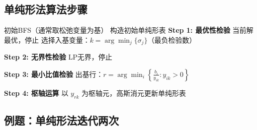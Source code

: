 \subsection{单纯形法算法步骤}

\begin{algorithm}[H]
\caption{单纯形法}
\begin{algorithmic}[1]
\Require 初始BFS（通常取松弛变量为基）
\State 构造初始单纯形表
    \State \textbf{Step 1: 最优性检验}
        \State 当前解最优，停止
    \EndIf
    \State 选择入基变量：$k = \arg\min_j \{\sigma_j\}$（最负检验数）
    
    \State \textbf{Step 2: 无界性检验}
        \State LP无界，停止
    \EndIf
    
    \State \textbf{Step 3: 最小比值检验}
    \State 出基行：$r = \arg\min_i \left\{\frac{b_i}{y_{ik}} : y_{ik} > 0\right\}$
    
    \State \textbf{Step 4: 枢轴运算}
    \State 以 $y_{rk}$ 为枢轴元，高斯消元更新单纯形表
\EndWhile
\end{algorithmic}
\end{algorithm}

\subsection{例题：单纯形法迭代两次}

